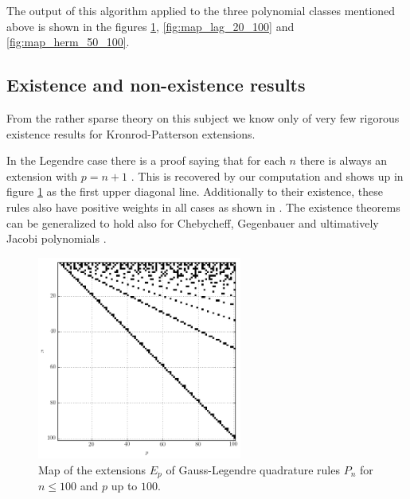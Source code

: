 \documentclass[a4paper,10pt]{article}
\begin{document}
The output of this algorithm applied to the three polynomial classes mentioned
above is shown in the figures \ref{fig:map_leg_100_100}, \ref{fig:map_lag_20_100}
and \ref{fig:map_herm_50_100}.




\subsection{Existence and non-existence results}

From the rather sparse theory on this subject we know only of very few rigorous
existence results for Kronrod-Patterson extensions.

In the Legendre case there is a proof saying that for each $n$ there is
always an extension with $p = n + 1$ \cite{szegoe}. This is recovered by our
computation and shows up in figure \ref{fig:map_leg_100_100} as the first upper
diagonal line. Additionally to their existence, these rules also have positive
weights in all cases as shown in \cite{monegato1978}. The existence theorems can
be generalized to hold also for Chebycheff, Gegenbauer and ultimatively Jacobi
polynomials \cite{gautschi-notaris, gautschi, notaris1990, monegato1978_2}.

\begin{figure}
  \centering
  \includegraphics[width=0.6\textwidth]{./img/map_leg_100_100.png}
  \caption{Map of the extensions $E_p$ of Gauss-Legendre quadrature rules
           $P_n$ for $n \leq 100$ and $p$ up to $100$.}
  \label{fig:map_leg_100_100}
\end{figure}
\end{document}
